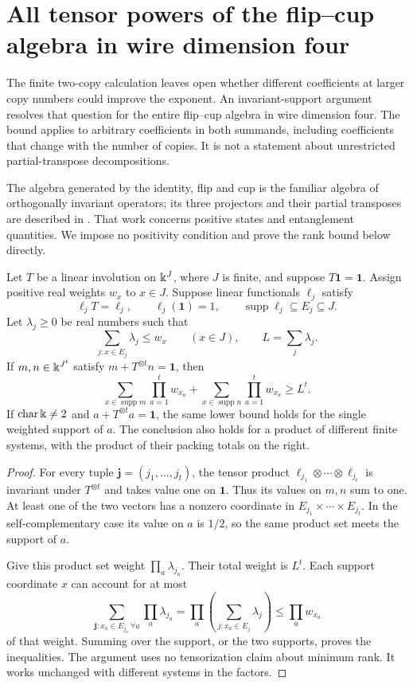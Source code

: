 \section{All tensor powers of the flip--cup algebra in wire dimension four}
\label{sec:full-flip-cup}

The finite two-copy calculation leaves open whether different
coefficients at larger copy numbers could improve the exponent.
An invariant-support argument resolves that question for the entire
flip--cup algebra in wire dimension four. The bound applies to arbitrary
coefficients in both summands, including coefficients that change with
the number of copies. It is not a statement about unrestricted
partial-transpose decompositions.

The algebra generated by the identity, flip and cup is the familiar
algebra of orthogonally invariant operators; its three projectors and
their partial transposes are described in
\cite[Section~VI.B, pp.~5--6]{ADVW2002}. That work concerns positive
states and entanglement quantities. We impose no positivity condition
and prove the rank bound below directly.

\begin{lemma}
\label{lem:invariant-support-packing}
Let $T$ be a linear involution on $\Bbbk^J$, where $J$ is finite,
and suppose $T\mathbf1=\mathbf1$. Assign positive real weights
$w_x$ to $x\in J$. Suppose linear functionals $\ell_j$ satisfy
\[
 \ell_jT=\ell_j,\qquad \ell_j(\mathbf1)=1,
 \qquad \operatorname{supp}\ell_j\subseteq E_j\subseteq J.
\]
Let $\lambda_j\geq0$ be real numbers such that
\[
 \sum_{j:x\in E_j}\lambda_j\leq w_x\qquad(x\in J),
 \qquad L=\sum_j\lambda_j.
\]
If $m,n\in\Bbbk^{J^t}$ satisfy
$m+T^{\otimes t}n=\mathbf1$, then
\[
 \sum_{x\in\operatorname{supp}m}\prod_{a=1}^t w_{x_a}
 +\sum_{x\in\operatorname{supp}n}\prod_{a=1}^t w_{x_a}
 \geq L^t.
\]
If $\operatorname{char}\Bbbk\ne2$ and
$a+T^{\otimes t}a=\mathbf1$, the same lower bound holds for the
single weighted support of $a$. The conclusion also holds for a
product of different finite systems, with the product of their
packing totals on the right.
\end{lemma}
\begin{proof}
For every tuple $\mathbf j=(j_1,\ldots,j_t)$, the tensor product
$\ell_{j_1}\otimes\cdots\otimes\ell_{j_t}$ is invariant under
$T^{\otimes t}$ and takes value one on $\mathbf1$.
Thus its values on $m,n$ sum to one. At least one of the two vectors
has a nonzero coordinate in
$E_{j_1}\times\cdots\times E_{j_t}$.
In the self-complementary case its value on $a$ is $1/2$, so the
same product set meets the support of $a$.

Give this product set weight $\prod_a\lambda_{j_a}$.
Their total weight is $L^t$. Each support coordinate $x$ can account
for at most
\[
 \sum_{\mathbf j:x_a\in E_{j_a}\ \forall a}
       \prod_a\lambda_{j_a}
 =\prod_a\left(\sum_{j:x_a\in E_j}\lambda_j\right)
 \leq\prod_a w_{x_a}
\]
of that weight. Summing over the support, or the two supports,
proves the inequalities. The argument uses no tensorization claim
about minimum rank. It works unchanged with different systems
in the factors.
\end{proof}

